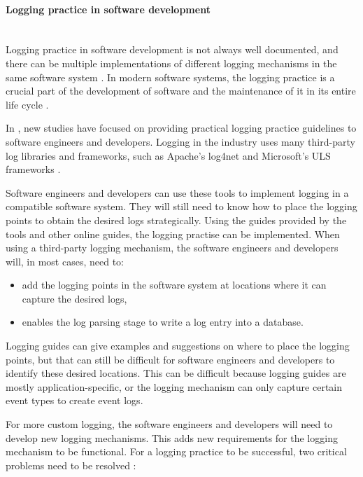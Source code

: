 \paragraph{Logging practice in software development}\label{sec:ch1_loggingPractice}\leavevmode\\
Logging practice in software development is not always well documented, and there can be multiple implementations of different logging mechanisms in the same software system \cite{Pecchia2015, Kitchenham2007}. In modern software systems, the logging practice is a crucial part of the development of software and the maintenance of it in its entire life cycle \cite{Rong2018}.\par In , new studies have focused on providing practical logging practice guidelines to software engineers and developers. Logging in the industry uses many third-party log libraries and frameworks, such as Apache's log4net and Microsoft's ULS frameworks \cite{Zhu2015, Rong2018}.\par Software engineers and developers can use these tools to implement logging in a compatible software system. They will still need to know how to place the logging points to obtain the desired logs strategically. Using the guides provided by the tools and other online guides, the logging practise can be implemented. When using a third-party logging mechanism, the software engineers and developers will, in most cases, need to:

\begin{itemize}
	\item add the logging points in the software system at locations where it can capture the desired logs,
	\item enables the log parsing stage to write a log entry into a database.
\end{itemize}

Logging guides can give examples and suggestions on where to place the logging points, but that can still be difficult for software engineers and developers to identify these desired locations. This can be difficult because logging guides are mostly application-specific, or the logging mechanism can only capture certain event types to create event logs. \par For more custom logging, the software engineers and developers will need to develop new logging mechanisms. This adds new requirements for the logging mechanism to be functional. For a logging practice to be successful, two critical problems need to be resolved \cite{Zhu2015, Zhu2019, Rong2018}:

